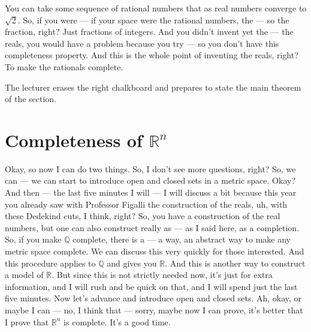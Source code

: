 \begin{spoken-clean}[00:07:34 - 00:09:25]
You can take some sequence of rational numbers that as real numbers converge to $\sqrt{2}$. So, if you were --- if your space were the rational numbers, the --- so the fraction, right? Just fractions of integers. And you didn't invent yet the --- the reals, you would have a problem because you try --- so you don't have this completeness property. And this is the whole point of inventing the reals, right? To make the rationals complete.
\end{spoken-clean}

\begin{meta-note}[Transition]
The lecturer erases the right chalkboard and prepares to state the main theorem of the section.
\end{meta-note}

\section{Completeness of \texorpdfstring{$\mathbb{R}^n$}{Rn}}

\begin{spoken-clean}[00:09:25 - 00:11:08]
Okay, so now I can do two things. So, I don't see more questions, right? So, we can --- we can start to introduce open and closed sets in a metric space. Okay? And then --- the last five minutes I will --- I will discuss a bit because this year you already saw with Professor Figalli the construction of the reals, uh, with these Dedekind cuts, I think, right? So, you have a construction of the real numbers, but one can also construct really as --- as I said here, as a completion. So, if you make $\mathbb{Q}$ complete, there is a --- a way, an abstract way to make any metric space complete. We can discuss this very quickly for those interested. And this procedure applies to $\mathbb{Q}$ and gives you $\mathbb{R}$. And this is another way to construct a model of $\mathbb{R}$. But since this is not strictly needed now, it's just for extra information, and I will rush and be quick on that, and I will spend just the last five minutes. Now let's advance and introduce open and closed sets. Ah, okay, or maybe I can --- no, I think that --- sorry, maybe now I can prove, it's better that I prove that $\mathbb{R}^n$ is complete. It's a good time.
\end{spoken-clean}

